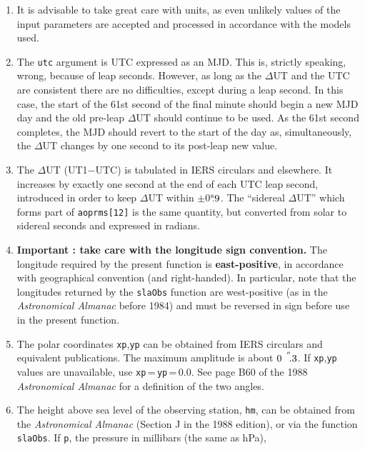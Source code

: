 \documentclass[11pt,fleqn,twoside]{article}
\renewcommand{\_}{{\tt\char'137}}     %
\newcommand{\arcseci}[1] {$#1\hspace{0.05em}$\raisebox{-0.5ex}
                         {$^{'\hspace{-0.1em}'\hspace{0.0em}}$}}
\newcommand{\arcsec}[2] {\arcseci{#1}$\hspace{-0.35em}.#2$}
\newcommand{\tseci}[1]   {$#1$\mbox{$^{\rm s}$}}
\newcommand{\tsec}[2]    {\tseci{#1}$\hspace{-0.3em}.#2$}
\begin{document}
{
 \begin{enumerate}
  \item It is advisable to take great care with units, as even
        unlikely values of the input parameters are accepted and
        processed in accordance with the models used.
  \item The {\tt utc} argument is UTC expressed as an MJD.  This is,
        strictly speaking, wrong, because of leap seconds.  However,
        as long as the $\Delta$UT and the UTC are consistent there
        are no difficulties, except during a leap second.  In this
        case, the start of the 61st second of the final minute should
        begin a new MJD day and the old pre-leap $\Delta$UT should
        continue to be used.  As the 61st second completes, the MJD
        should revert to the start of the day as, simultaneously,
        the $\Delta$UT changes by one second to its post-leap new value.
  \item The $\Delta$UT (UT1$-$UTC) is tabulated in IERS circulars and
        elsewhere.  It increases by exactly one second at the end of
        each UTC leap second, introduced in order to keep $\Delta$UT
        within $\pm$\tsec{0}{9}.  The ``sidereal $\Delta$UT'' which forms
        part of {\tt aoprms[12]} is the
        same quantity, but converted from solar
        to sidereal seconds and expressed in radians.
  \item {\bf Important : take care with the longitude sign convention.}  The
        longitude required by the present function is {\bf east-positive},
        in accordance with geographical convention (and right-handed).
        In particular, note that the longitudes returned by the
        {\tt slaObs} function are west-positive (as in the {\it Astronomical
        Almanac}\/ before 1984) and must be reversed in sign before use in
        the present function.
  \item The polar coordinates {\tt xp},{\tt yp} can be obtained from IERS
        circulars and equivalent publications.  The
        maximum amplitude is about \arcsec{0}{3}.
        If {\tt xp},{\tt yp} values
        are unavailable, use {\tt xp}\,=\,{\tt yp}\,=\,0.0.
        See page B60 of the 1988
        {\it Astronomical Almanac}\/ for a definition of the two angles.
  \item The height above sea level of the observing station, {\tt hm},
        can be obtained from the {\it Astronomical Almanac}\/ (Section J
        in the 1988 edition), or via the function {\tt slaObs}.  If {\tt p},
        the pressure in millibars (the same as hPa),

\end{enumerate}}
\end{document}
